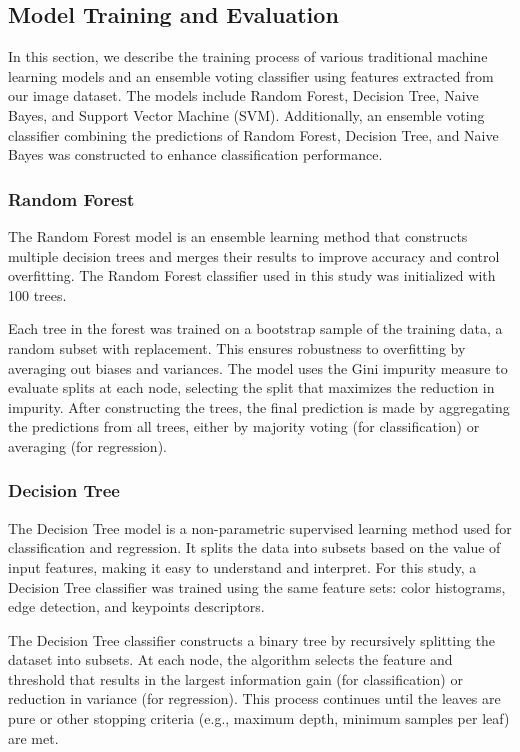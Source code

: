 \documentclass[10pt,twocolumn,letterpaper]{article}
\begin{document}
\subsection{Model Training and Evaluation}
In this section, we describe the training process of various traditional machine learning models and an ensemble voting classifier using features extracted from our image dataset. The models include Random Forest, Decision Tree, Naive Bayes, and Support Vector Machine (SVM). Additionally, an ensemble voting classifier combining the predictions of Random Forest, Decision Tree, and Naive Bayes was constructed to enhance classification performance.

\subsubsection{Random Forest}

The Random Forest model is an ensemble learning method that constructs multiple decision trees and merges their results to improve accuracy and control overfitting. The Random Forest classifier used in this study was initialized with 100 trees.

Each tree in the forest was trained on a bootstrap sample of the training data, a random subset with replacement. This ensures robustness to overfitting by averaging out biases and variances. The model uses the Gini impurity measure to evaluate splits at each node, selecting the split that maximizes the reduction in impurity. After constructing the trees, the final prediction is made by aggregating the predictions from all trees, either by majority voting (for classification) or averaging (for regression).

\subsubsection{Decision Tree}

The Decision Tree model is a non-parametric supervised learning method used for classification and regression. It splits the data into subsets based on the value of input features, making it easy to understand and interpret. For this study, a Decision Tree classifier was trained using the same feature sets: color histograms, edge detection, and keypoints descriptors.

The Decision Tree classifier constructs a binary tree by recursively splitting the dataset into subsets. At each node, the algorithm selects the feature and threshold that results in the largest information gain (for classification) or reduction in variance (for regression). This process continues until the leaves are pure or other stopping criteria (e.g., maximum depth, minimum samples per leaf) are met.
\end{document}
